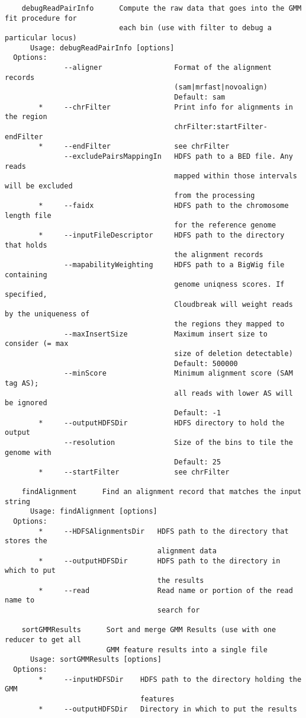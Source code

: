 \documentclass[11pt]{article}
\begin{document}
\begin{verbatim}
    debugReadPairInfo      Compute the raw data that goes into the GMM fit procedure for 
                           each bin (use with filter to debug a particular locus)
      Usage: debugReadPairInfo [options]
  Options:
              --aligner                 Format of the alignment records
                                        (sam|mrfast|novoalign)
                                        Default: sam
        *     --chrFilter               Print info for alignments in the region
                                        chrFilter:startFilter-endFilter
        *     --endFilter               see chrFilter
              --excludePairsMappingIn   HDFS path to a BED file. Any reads
                                        mapped within those intervals will be excluded
                                        from the processing
        *     --faidx                   HDFS path to the chromosome length file
                                        for the reference genome
        *     --inputFileDescriptor     HDFS path to the directory that holds
                                        the alignment records
              --mapabilityWeighting     HDFS path to a BigWig file containing
                                        genome uniqness scores. If specified,
                                        Cloudbreak will weight reads by the uniqueness of
                                        the regions they mapped to
              --maxInsertSize           Maximum insert size to consider (= max
                                        size of deletion detectable)
                                        Default: 500000
              --minScore                Minimum alignment score (SAM tag AS);
                                        all reads with lower AS will be ignored
                                        Default: -1
        *     --outputHDFSDir           HDFS directory to hold the output
              --resolution              Size of the bins to tile the genome with
                                        Default: 25
        *     --startFilter             see chrFilter

    findAlignment      Find an alignment record that matches the input string
      Usage: findAlignment [options]
  Options:
        *     --HDFSAlignmentsDir   HDFS path to the directory that stores the
                                    alignment data
        *     --outputHDFSDir       HDFS path to the directory in which to put
                                    the results
        *     --read                Read name or portion of the read name to
                                    search for

    sortGMMResults      Sort and merge GMM Results (use with one reducer to get all 
                        GMM feature results into a single file
      Usage: sortGMMResults [options]
  Options:
        *     --inputHDFSDir    HDFS path to the directory holding the GMM
                                features
        *     --outputHDFSDir   Directory in which to put the results
\end{verbatim}
\end{document}
